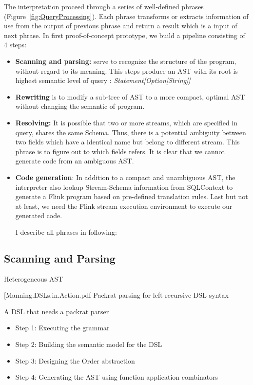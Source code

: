 The interpretation proceed through a series of well-defined phrases (Figure~\ref{fig:QueryProcessing}). Each phrase transforms or extracts information of use from the output of previous phrase and return a result which is a input of next phrase. In first proof-of-concept prototype, we build a pipeline consisting of 4 steps:
\begin{itemize}
	\item \textbf{Scanning and parsing:} serve to recognize the structure of the program, without regard to its meaning. This steps produce an AST with its root is highest semantic level of query : \textit{Statement[Option[String]]}

	\item \textbf{Rewriting} is to modify a sub-tree of AST to a more compact, optimal AST without changing the semantic of program.
	
	\item \textbf{Resolving:} It is possible that two or more streams, which are specified in query,  shares the same Schema. Thus, there is a potential ambiguity between two fields which have a identical name but belong to different stream. This phrase is to figure out to which fields refers. It is clear that we cannot generate code from an ambiguous AST.
	
	\item \textbf{Code generation}: In addition to a compact and unambiguous AST, the interpreter also lookup Stream-Schema information from SQLContext to generate a Flink program based on pre-defined translation rules. Last but not at least, we need the Flink stream execution environment to execute our generated code.
	
I describe all phrases in following: 
	
\end{itemize}
\subsection{Scanning and Parsing}


 Heterogeneous AST

[Manning.DSLs.in.Action.pdf
Packrat parsing for left recursive DSL syntax

A DSL that needs a packrat parser


\begin{itemize}
	\item Step 1: Executing the grammar
	\item Step 2: Building the semantic model for the DSL
	\item Step 3: Designing the Order abstraction
	\item Step 4: Generating the AST using function application combinators
\end{itemize}




